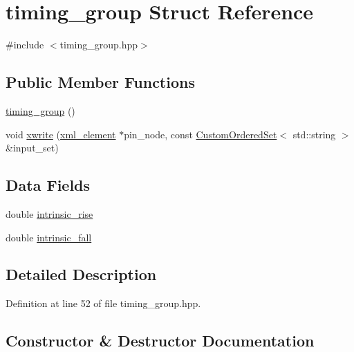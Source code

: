 \hypertarget{structtiming__group}{}\section{timing\+\_\+group Struct Reference}
\label{structtiming__group}


{\ttfamily \#include $<$timing\+\_\+group.\+hpp$>$}

\subsection*{Public Member Functions}
\begin{DoxyCompactItemize}
\item 
\hyperlink{structtiming__group_adaa77a568c0e227748624ce5d8f5257c}{timing\+\_\+group} ()
\item 
void \hyperlink{structtiming__group_adc04799a8abb0eda2eeff30a409c19f2}{xwrite} (\hyperlink{classxml__element}{xml\+\_\+element} $\ast$pin\+\_\+node, const \hyperlink{classCustomOrderedSet}{Custom\+Ordered\+Set}$<$ std\+::string $>$ \&input\+\_\+set)
\end{DoxyCompactItemize}
\subsection*{Data Fields}
\begin{DoxyCompactItemize}
\item 
double \hyperlink{structtiming__group_a3efb5b55c8fdd7b73096b3787d5c64be}{intrinsic\+\_\+rise}
\item 
double \hyperlink{structtiming__group_a111262e8635422eb639f132b55f2be85}{intrinsic\+\_\+fall}
\end{DoxyCompactItemize}


\subsection{Detailed Description}


Definition at line 52 of file timing\+\_\+group.\+hpp.



\subsection{Constructor \& Destructor Documentation}
\mbox{\label{structtiming__group_adaa77a568c0e227748624ce5d8f5257c}} 
